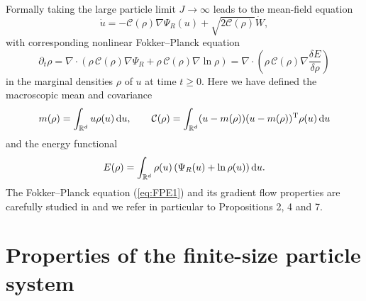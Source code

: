 \documentclass[11pt]{article}
\begin{document}
Formally taking the large particle limit $J\to \infty$ leads to the mean-field equation
\begin{equation}
\dot{u} = -\mathcal{C}(\rho)\nabla\Psi_R(u) + \sqrt{2\mathcal{C}(\rho)}\dot{W},
\end{equation}
with corresponding nonlinear Fokker--Planck equation 
\begin{equation} \label{eq:FPE1}
\partial_t \rho = \nabla \cdot \left( \rho\, \mathcal{C} (\rho)\nabla \Psi_R  + \rho \,\mathcal{C}(\rho)\nabla \ln \rho \right)
= \nabla \cdot \left( \rho \,\mathcal{C}(\rho) \nabla \frac{\delta E}{\delta \rho}\right)
\end{equation}
in the marginal densities $\rho$ of $u$ at time $t\ge 0$.
Here we have defined the macroscopic mean and covariance
\begin{equation}
m(\rho) = \int_{\mathbb{R}^d} u \rho(u) \,{\rm d}u, \qquad \mathcal{C}(\rho) = 
\int_{\mathbb{R}^d} (u-m(\rho))(u-m(\rho))^{\rm T} \rho(u)\, {\rm d}u
\end{equation}
and the energy functional
\begin{equation}
E(\rho) = \int_{\mathbb{R}^d} \rho(u) \left(\Psi_R(u) + \ln\rho(u)\right) {\rm d}u.
\end{equation}
The Fokker--Planck equation (\ref{eq:FPE1}) and its gradient flow properties are carefully studied in \cite{sr:GIHLS19} and we refer in particular to
Propositions 2, 4 and 7.

\section{Properties of the finite-size particle system}
\end{document}
